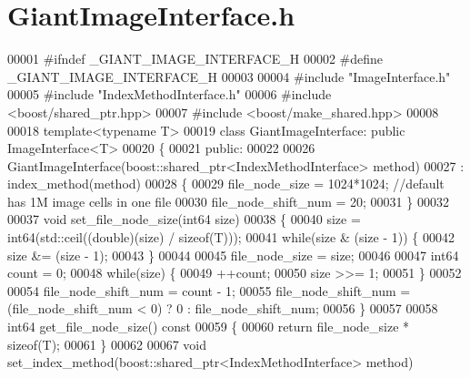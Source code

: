 \section{Giant\-Image\-Interface.\-h}
\label{_giant_image_interface_8h}

\begin{DoxyCode}
00001 \textcolor{preprocessor}{#ifndef \_GIANT\_IMAGE\_INTERFACE\_H}
00002 \textcolor{preprocessor}{}\textcolor{preprocessor}{#define \_GIANT\_IMAGE\_INTERFACE\_H}
00003 \textcolor{preprocessor}{}
00004 \textcolor{preprocessor}{#include "ImageInterface.h"}
00005 \textcolor{preprocessor}{#include "IndexMethodInterface.h"}
00006 \textcolor{preprocessor}{#include <boost/shared\_ptr.hpp>}
00007 \textcolor{preprocessor}{#include <boost/make\_shared.hpp>}
00008 
00018 \textcolor{keyword}{template}<\textcolor{keyword}{typename} T>
00019 \textcolor{keyword}{class }GiantImageInterface: \textcolor{keyword}{public} ImageInterface<T>
00020 \{
00021 \textcolor{keyword}{public}:
00022 
00026         GiantImageInterface(boost::shared\_ptr<IndexMethodInterface> method)
00027                 : index_method(method)
00028         \{
00029                 file_node_size = 1024*1024;             \textcolor{comment}{//default has 1M image
       cells in one file}
00030                 file_node_shift_num = 20;
00031         \}
00032 
00037         \textcolor{keywordtype}{void} set_file_node_size(int64 size)
00038         \{
00040                 size = int64(std::ceil((\textcolor{keywordtype}{double})(size) / \textcolor{keyword}{sizeof}(T)));
00041                 \textcolor{keywordflow}{while}(size & (size - 1)) \{
00042                         size &= (size - 1);
00043                 \}
00044 
00045                 file_node_size = size;
00046 
00047                 int64 count = 0;
00048                 \textcolor{keywordflow}{while}(size) \{
00049                         ++count;
00050                         size >>= 1;
00051                 \}
00052 
00054                 file_node_shift_num = count - 1;
00055                 file_node_shift_num = (file_node_shift_num < 0) ? 0 : 
      file_node_shift_num;
00056         \}
00057 
00058         int64 get\_file\_node\_size()\textcolor{keyword}{ const}
00059 \textcolor{keyword}{        }\{
00060                 \textcolor{keywordflow}{return} file_node_size * \textcolor{keyword}{sizeof}(T);
00061         \}
00062 
00067         \textcolor{keywordtype}{void} set_index_method(boost::shared\_ptr<IndexMethodInterface> method)

\end{DoxyCode}
